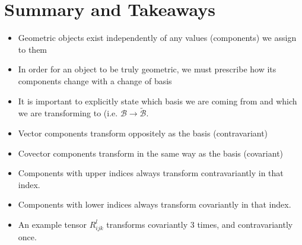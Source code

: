 \documentclass[a4paper]{article}
\begin{document}
\section*{Summary and Takeaways}%
\begin{itemize}
  \item Geometric objects exist independently of any values (components) we assign to them
  \item In order for an object to be truly geometric, we must prescribe how its components change with a change of basis
  \item It is important to explicitly state which basis we are coming from and which we are transforming to (i.e. $\mathcal{B} \rightarrow \widetilde{\mathcal{B}}$.
  \item Vector components transform oppositely as the basis (contravariant)
  \item Covector components transform in the same way as the basis (covariant)
  \item Components with upper indices always transform contravariantly in that index.
  \item Components with lower indices always transform covariantly in that index. 
  \item An example tensor $R_{ijk}^l$ transforms covariantly 3 times, and contravariantly once.
\end{itemize}
\end{document}
